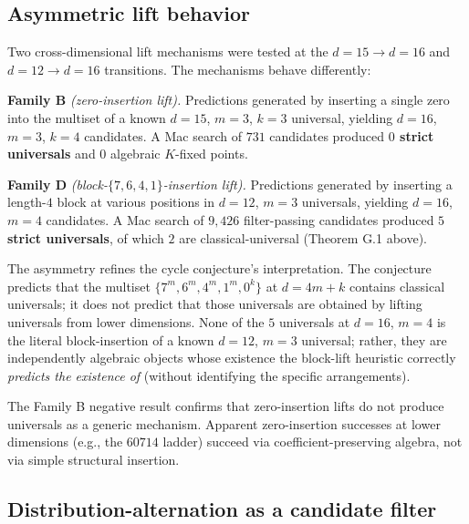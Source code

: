 \documentclass[11pt,letterpaper]{article}
\theoremstyle{paperstyle}
\theoremstyle{paperstyledef}
\theoremstyle{paperstylerem}
\begin{document}
\hypertarget{g.5-asymmetric-lift-behavior}{%
\subsection{Asymmetric lift behavior}\label{g.5-asymmetric-lift-behavior}}

Two cross-dimensional lift mechanisms were tested at the
\(d = 15 \to d = 16\) and \(d = 12 \to d = 16\) transitions. The
mechanisms behave differently:

\textbf{Family B} \emph{(zero-insertion lift).} Predictions generated by
inserting a single zero into the multiset of a known \(d = 15\),
\(m = 3\), \(k = 3\) universal, yielding \(d = 16\), \(m = 3\),
\(k = 4\) candidates. A Mac search of \(731\) candidates produced
\textbf{\(0\) strict universals} and \(0\) algebraic \(K\)-fixed points.

\textbf{Family D} \emph{(block-\(\{7, 6, 4, 1\}\)-insertion lift).}
Predictions generated by inserting a length-\(4\) block at various
positions in \(d = 12\), \(m = 3\) universals, yielding \(d = 16\),
\(m = 4\) candidates. A Mac search of \(9{,}426\) filter-passing
candidates produced \textbf{\(5\) strict universals}, of which \(2\) are
classical-universal (Theorem G.1 above).

The asymmetry refines the cycle conjecture's interpretation. The
conjecture predicts that the multiset \(\{7^m, 6^m, 4^m, 1^m, 0^k\}\) at
\(d = 4m + k\) contains classical universals; it does not predict that
those universals are obtained by lifting universals from lower
dimensions. None of the \(5\) universals at \(d = 16\), \(m = 4\) is the
literal block-insertion of a known \(d = 12\), \(m = 3\) universal;
rather, they are independently algebraic objects whose existence the
block-lift heuristic correctly \emph{predicts the existence of} (without
identifying the specific arrangements).

The Family B negative result confirms that zero-insertion lifts do not
produce universals as a generic mechanism. Apparent zero-insertion
successes at lower dimensions (e.g., the \(60714\) ladder) succeed via
coefficient-preserving algebra, not via simple structural insertion.

\hypertarget{g.6-distribution-alternation-as-a-candidate-filter}{%
\subsection{Distribution-alternation as a candidate filter}\label{g.6-distribution-alternation-as-a-candidate-filter}}
\end{document}
